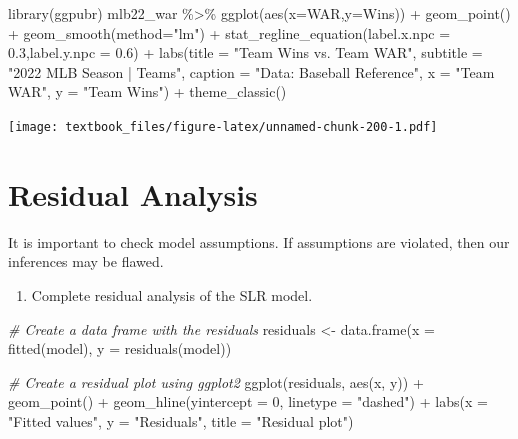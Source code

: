\documentclass[
  11pt,
]{book}
\newenvironment{Shaded}{\begin{snugshade}}{\end{snugshade}}
\newcommand{\AttributeTok}[1]{\textcolor[rgb]{0.77,0.63,0.00}{#1}}
\newcommand{\CommentTok}[1]{\textcolor[rgb]{0.56,0.35,0.01}{\textit{#1}}}
\newcommand{\DecValTok}[1]{\textcolor[rgb]{0.00,0.00,0.81}{#1}}
\newcommand{\FloatTok}[1]{\textcolor[rgb]{0.00,0.00,0.81}{#1}}
\newcommand{\FunctionTok}[1]{\textcolor[rgb]{0.00,0.00,0.00}{#1}}
\newcommand{\NormalTok}[1]{#1}
\newcommand{\OtherTok}[1]{\textcolor[rgb]{0.56,0.35,0.01}{#1}}
\newcommand{\SpecialCharTok}[1]{\textcolor[rgb]{0.00,0.00,0.00}{#1}}
\newcommand{\StringTok}[1]{\textcolor[rgb]{0.31,0.60,0.02}{#1}}
\providecommand{\tightlist}{%
  \setlength{\itemsep}{0pt}\setlength{\parskip}{0pt}}
\theoremstyle{definition}
\theoremstyle{definition}
\theoremstyle{definition}
\theoremstyle{definition}
\theoremstyle{remark}
\begin{document}
\begin{Shaded}
\begin{Highlighting}[]
\FunctionTok{library}\NormalTok{(ggpubr)}
\NormalTok{mlb22\_war }\SpecialCharTok{\%\textgreater{}\%} \FunctionTok{ggplot}\NormalTok{(}\FunctionTok{aes}\NormalTok{(}\AttributeTok{x=}\NormalTok{WAR,}\AttributeTok{y=}\NormalTok{Wins)) }\SpecialCharTok{+}
  \FunctionTok{geom\_point}\NormalTok{() }\SpecialCharTok{+}
  \FunctionTok{geom\_smooth}\NormalTok{(}\AttributeTok{method=}\StringTok{"lm"}\NormalTok{) }\SpecialCharTok{+} 
  \FunctionTok{stat\_regline\_equation}\NormalTok{(}\AttributeTok{label.x.npc =} \FloatTok{0.3}\NormalTok{,}\AttributeTok{label.y.npc =} \FloatTok{0.6}\NormalTok{) }\SpecialCharTok{+}
  \FunctionTok{labs}\NormalTok{(}\AttributeTok{title =} \StringTok{"Team Wins vs. Team WAR"}\NormalTok{,}
       \AttributeTok{subtitle =} \StringTok{"2022 MLB Season | Teams"}\NormalTok{,}
       \AttributeTok{caption =} \StringTok{"Data: Baseball Reference"}\NormalTok{, }
       \AttributeTok{x =} \StringTok{"Team WAR"}\NormalTok{,}
       \AttributeTok{y =} \StringTok{"Team Wins"}\NormalTok{) }\SpecialCharTok{+}
  \FunctionTok{theme\_classic}\NormalTok{()}
\end{Highlighting}
\end{Shaded}

\texttt{[image: textbook\_files/figure-latex/unnamed-chunk-200-1.pdf]}
\newpage

\hypertarget{residual-analysis}{%
\section{Residual Analysis}\label{residual-analysis}}

It is important to check model assumptions. If assumptions are violated, then our inferences may be flawed.

\begin{enumerate}
\def\labelenumi{(\alph{enumi})}
\setcounter{enumi}{3}
\tightlist
\item
  Complete residual analysis of the SLR model.
\end{enumerate}

\begin{Shaded}
\begin{Highlighting}[]
\CommentTok{\# Create a data frame with the residuals}
\NormalTok{residuals }\OtherTok{\textless{}{-}} \FunctionTok{data.frame}\NormalTok{(}\AttributeTok{x =} \FunctionTok{fitted}\NormalTok{(model), }\AttributeTok{y =} \FunctionTok{residuals}\NormalTok{(model))}

\CommentTok{\# Create a residual plot using ggplot2}
\FunctionTok{ggplot}\NormalTok{(residuals, }\FunctionTok{aes}\NormalTok{(x, y)) }\SpecialCharTok{+}
  \FunctionTok{geom\_point}\NormalTok{() }\SpecialCharTok{+}
  \FunctionTok{geom\_hline}\NormalTok{(}\AttributeTok{yintercept =} \DecValTok{0}\NormalTok{, }\AttributeTok{linetype =} \StringTok{"dashed"}\NormalTok{) }\SpecialCharTok{+}
  \FunctionTok{labs}\NormalTok{(}\AttributeTok{x =} \StringTok{"Fitted values"}\NormalTok{, }\AttributeTok{y =} \StringTok{"Residuals"}\NormalTok{, }\AttributeTok{title =} \StringTok{"Residual plot"}\NormalTok{)}
\end{Highlighting}
\end{Shaded}
\end{document}
